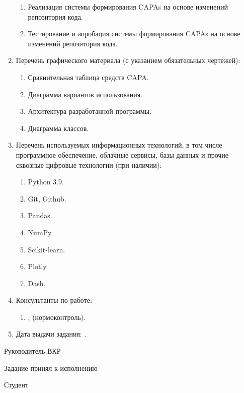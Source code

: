 \begin{enumerate}[1.]
\begin{enumerate}[label=\theenumi\arabic*.]
\item Реализация системы формирования CAPAs на основе изменений репозитория кода.
\item Тестирование и апробация системы формирования CAPAs на основе изменений репозитория кода.
\end{enumerate}
\item Перечень графического материала (с указанием обязательных чертежей): 
\begin{enumerate}[label=\theenumi\arabic*.]
\item Сравнительная таблица средств CAPA.
\item Диаграмма вариантов использования.
\item Архитектура разработанной программы.
\item Диаграмма классов.
\end{enumerate}
\item Перечень используемых информационных технологий, в том числе программное обеспечение, облачные сервисы, базы данных и прочие сквозные цифровые технологии (при наличии):
\begin{enumerate}[label=\theenumi\arabic*.]
\item Python 3.9.
\item Git, Github.
\item Pandas.
\item NumPy.
\item Scikit-learn.
\item Plotly.
\item Dash.
\end{enumerate}
\item Консультанты по работе:
\begin{enumerate}[label=\theenumi\arabic*.] 
\item {\emakefirstuc{\ConsultantNormDegree}, \ConsultantNorm{} (нормоконтроль).} %
\end{enumerate}
\item Дата выдачи задания: {\thesisStartDate.}
\end{enumerate}

\intervalS%

Руководитель ВКР {\hspace*{0.1\textheight} \Supervisor}


Задание принял к исполнению {\thesisStartDate}

\intervalS%

Студент {\hspace*{0.1\textheight}  \Author}



